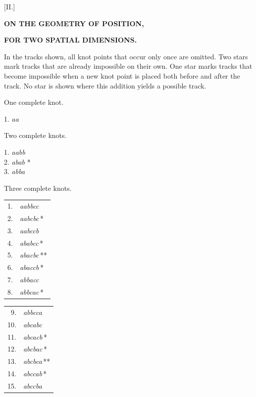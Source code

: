 \clearpage{}
\begin{center}
[II.]
\end{center}

\begin{center}\textbf{ON THE GEOMETRY OF POSITION,}\par\medskip\textbf{FOR TWO SPATIAL DIMENSIONS.}\end{center}

In the tracks shown, all knot points that occur only once are omitted. Two stars mark tracks that are already impossible on their own. One star marks tracks that become impossible when a new knot point is placed both before and after the track. No star is shown where this addition yields a possible track.

\begin{center}
One complete knot.

1. \emph{aa}
\end{center}

\begin{center}
Two complete knots.

1. \emph{aabb}\\
2. \emph{abab} *\\
3. \emph{abba}
\end{center}

\begin{center}
Three complete knots.
\end{center}
\begin{center}
\begin{minipage}[t]{.30\linewidth}\centering\begin{tabular}[t]{rl}
1. & \emph{aabbcc} \\
2. & \emph{aabcbc}\,* \\
3. & \emph{aabccb} \\
4. & \emph{ababcc}\,* \\
5. & \emph{abacbc}\,** \\
6. & \emph{abaccb}\,* \\
7. & \emph{abbacc} \\
8. & \emph{abbcac}\,* \\
\end{tabular}\end{minipage}\hspace{1em}\begin{minipage}[t]{.30\linewidth}\centering\begin{tabular}[t]{rl}
9. & \emph{abbcca} \\
10. & \emph{abcabc} \\
11. & \emph{abcacb}\,* \\
12. & \emph{abcbac}\,* \\
13. & \emph{abcbca}\,** \\
14. & \emph{abccab}\,* \\
15. & \emph{abccba} \\
\end{tabular}\end{minipage}
\end{center}
